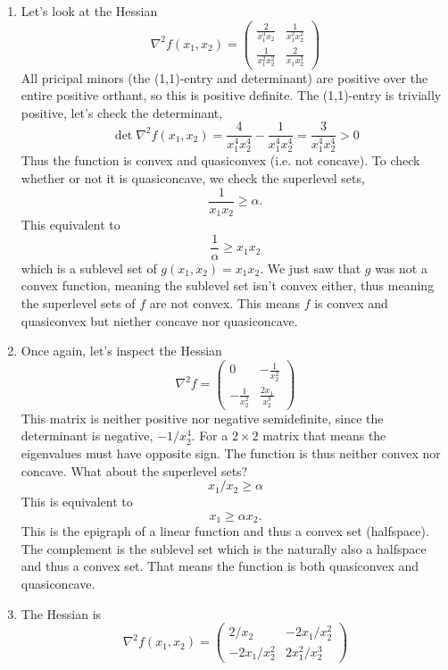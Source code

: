 \begin{enumerate}[label=(\alph*)]
    \item Let's look at the Hessian
    \[
        \nabla^2 f(x_1, x_2) = \begin{pmatrix}
            \frac{2}{x_1^3x_2} & \frac{1}{x_1^2x_2^2}\\
            \frac{1}{x_1^2x_2^2} & \frac{2}{x_1x_2^3}
        \end{pmatrix}
    \]
    All pricipal minors (the (1,1)-entry and determinant) are positive over the entire positive orthant, so this is positive definite.
    The (1,1)-entry is trivially positive, let's check the determinant,
    \[
        \det \nabla^2 f(x_1, x_2) = \frac{4}{x_1^4x_2^4} - \frac{1}{x_1^4x_2^4} = \frac{3}{x_1^4x_2^4} > 0
    \]
    Thus the function is convex and quasiconvex (i.e. not concave).
    To check whether or not it is quasiconcave, we check the superlevel sets,
    \[
        \frac{1}{x_1x_2} \geq \alpha.
    \]
    This equivalent to
    \[
        \frac{1}{\alpha} \geq x_1x_2
    \]
    which is a sublevel set of $g(x_1, x_2) = x_1x_2$. 
    We just saw that $g$ was not a convex function, meaning the sublevel set isn't convex either, thus meaning the superlevel sets of $f$ are not convex.
    This means $f$ is convex and quasiconvex but niether concave nor quasiconcave. 
    \item Once again, let's inspect the Hessian
    \[
        \nabla^2 f = \begin{pmatrix}
            0 & -\frac{1}{x_2^2}\\
            -\frac{1}{x_2^2} & \frac{2x_1}{x^3_2}
        \end{pmatrix}
    \]
    This matrix is neither positive nor negative semidefinite, since the determinant is negative, $-1 / x^4_2$.
    For a $2\times 2$ matrix that means the eigenvalues must have opposite sign.
    The function is thus neither convex nor concave. 
    What about the superlevel sets?
    \[
        x_1/x_2 \geq \alpha
    \]
    This is equivalent to
    \[
        x_1 \geq \alpha x_2.
    \]
    This is the epigraph of a linear function and thus a convex set (halfspace).
    The complement is the sublevel set which is the naturally also a halfspace and thus a convex set.
    That means the function is both quasiconvex and quasiconcave.
    \item The Hessian is
    \[
        \nabla^2 f(x_1, x_2) = \begin{pmatrix}
            2/x_2 & -2x_1/x_2^2\\
            -2x_1/x_2^2 & 2x_1^2/x_2^3
        \end{pmatrix}
\]
\end{enumerate}
